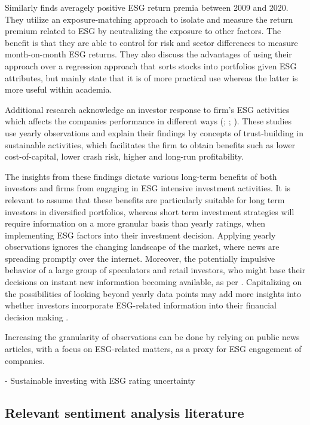 Similarly \cite{ESG_exposure_approach} finds averagely positive ESG return premia between 2009 and 2020. They utilize an exposure-matching approach to isolate and measure the return premium related to ESG by neutralizing the exposure to other factors. The benefit is that they are able to control for risk and sector differences to measure month-on-month ESG returns. They also discuss the advantages of using their approach over a regression approach that sorts stocks into portfolios given ESG attributes, but mainly state that it is of more practical use whereas the latter is more useful within academia.

Additional research acknowledge an investor response to firm's ESG activities which affects the companies performance in different ways (\cite{lins2017social}; \cite{kim2014corporate}; \cite{el2011does}). These studies use yearly observations and explain their findings by concepts of trust-building in sustainable activities, which facilitates the firm to obtain benefits such as lower cost-of-capital, lower crash risk, higher and long-run profitability.

The insights from these findings dictate various long-term benefits of both investors and firms from engaging in ESG intensive investment activities. It is relevant to assume that these benefits are particularly suitable for long term investors in diversified portfolios, whereas short term investment strategies will require information on a more granular basis than yearly ratings, when implementing ESG factors into their investment decision. Applying yearly observations ignores the changing landscape of the market, where news are spreading promptly over the internet. Moreover, the potentially impulsive behavior of a large group of speculators and retail investors, who might base their decisions on instant new information becoming available, as per \cite{black1986noise}. Capitalizing on the possibilities of looking beyond yearly data points may add more insights into whether investors incorporate ESG-related information into their financial decision making \citep{Sustainable_sentiment}. 

Increasing the granularity of observations can be done by relying on public news articles, with a focus on ESG-related matters, as a proxy for ESG engagement of companies. 

- Sustainable investing with ESG rating uncertainty

\subsection{Relevant sentiment analysis literature}


